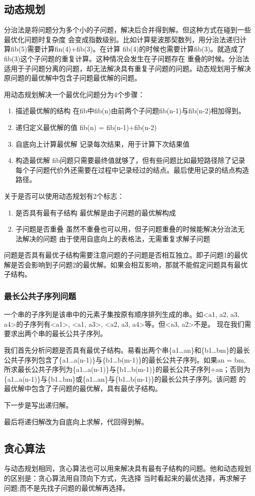\documentclass[11pt]{article}
\begin{document}
\subsection{动态规划}
\label{sec:orgbe19002}
分治法是将问题分为多个小的子问题，解决后合并得到解。但这种方式在碰到一些最优化问题时复杂度
会变成指数级别。比如计算斐波那契数列，用分治法递归计算fib(5)需要计算fin(4)+fib(3)。在计算
fib(4)的时候也需要计算fib(3)。就造成了fib(3)这个子问题的重复计算。这种情况会发生在子问题存在
重叠的时候。分治法适用于子问题分离的问题，却无法解决具有重复子问题的问题。动态规划用于解决
原问题的最优解中包含子问题最优解的问题。

用动态规划解决一个最优化问题分为4个步骤：

\begin{enumerate}
\item 描述最优解的结构 在fib中fib(n)由前两个子问题fib(n-1)与fib(n-2)相加得到。
\item 递归定义最优解的值 fib(n) = fib(n-1)+fib(n-2)
\item 自底向上计算最优解 记录每次结果，用于计算下次结果值
\item 构造最优解 fib问题只需要最终值就够了，但有些问题比如最短路径除了记录每个子问题代价外还需要在过程中记录经过的结点。最后使用记录的结点构造路径。
\end{enumerate}

关于是否可以使用动态规划有2个标志：
\begin{enumerate}
\item 是否具有最有子结构 最优解是由子问题的最优解构成
\item 子问题是否重叠 虽然不重叠也可以用，但子问题重叠的时候能解决分治法无法解决的问题
由于使用自底向上的表格法，无需重复求解子问题
\end{enumerate}

问题是否具有最优子结构需要注意问题的子问题是否相互独立。即子问题1的最优解是否会影响到子问题2的最优解。如果会相互影响，那就不能假定问题具有最优子结构。
\subsubsection{最长公共子序列问题}
\label{sec:orgd0f2a4c}
一个串的子序列是该串中的元素子集按原有顺序排列生成的串。如<a1, a2, a3, a4>的子序列有<a1>, <a1, a3>, <a2, a3, a4>等。但<a3, a2>不是。
现在我们需要求出两个串的最长公共子序列。

我们首先分析问题是否具有最优子结构。易看出两个串\{a1\ldots{}an\}和\{b1\ldots{}bm\}的最长公共子序列包含了\{a1\ldots{}a(n-1)\}与\{b1\ldots{}b(m-1)\}的最长公共子序列。如果an = bm,
所求最长公共子序列为\{a1\ldots{}a(n-1)\}与\{b1\ldots{}b(m-1)\}的最长公共子序列+an；否则为\{a1\ldots{}a(n-1)\}与\{b1\ldots{}bm\}或\{a1\ldots{}an\}与\{b1\ldots{}b(m-1)\}的最长公共子序列。该问题
的最优解中包含了子问题的最优解，具有最优子结构。

下一步是写出递归解。

最后将递归解改为自底向上求解，代回得到解。

\subsection{贪心算法}
\label{sec:org93052a5}
与动态规划相同，贪心算法也可以用来解决具有最有子结构的问题。他和动态规划的区别是：贪心算法用自顶向下方式，先选择
当时看起来的最优选择，再求解子问题;而不是先找子问题的最优解再选择。
\end{document}
